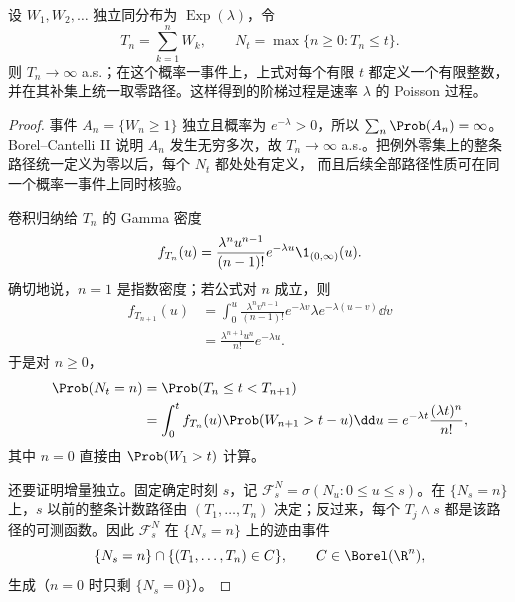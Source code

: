 \begin{theorem}\label{theorem:6-3-3-2}
设 $W_1,W_2,\ldots$ 独立同分布为 $\operatorname{Exp}(\lambda)$，令
\[
 T_n=\sum_{k=1}^nW_k,\qquad
 N_t=\max\{n\geq0:T_n\leq t\}.
\]
则 $T_n\to\infty$ a.s.；在这个概率一事件上，上式对每个有限 $t$ 都定义一个有限整数，
并在其补集上统一取零路径。这样得到的阶梯过程是速率
$\lambda$ 的 Poisson 过程。
\end{theorem}

\begin{proof}
事件 $A_n=\{W_n\geq1\}$ 独立且概率为 $e^{-\lambda}>0$，所以
$\sum_n\Prob(A_n)=\infty$。Borel--Cantelli II 说明 $A_n$ 发生无穷多次，故
$T_n\to\infty$ a.s.。把例外零集上的整条路径统一定义为零以后，每个 $N_t$ 都处处有定义，
而且后续全部路径性质可在同一个概率一事件上同时核验。

卷积归纳给 $T_n$ 的 Gamma 密度
\begin{equation}\label{eq:6-3-3-gamma-density}
 f_{T_n}(u)=\frac{\lambda^n u^{n-1}}{(n-1)!}e^{-\lambda u}\1_{(0,\infty)}(u).
\end{equation}
确切地说，$n=1$ 是指数密度；若公式对 $n$ 成立，则
\begin{align*}
 f_{T_{n+1}}(u)
 &=\int_0^u\frac{\lambda^nv^{n-1}}{(n-1)!}e^{-\lambda v}
     \lambda e^{-\lambda(u-v)}\dd v\\
 &=\frac{\lambda^{n+1}u^n}{n!}e^{-\lambda u}.
\end{align*}
于是对 $n\geq0$，
\begin{align*}
 \Prob(N_t=n)
 &=\Prob(T_n\leq t<T_{n+1})\\
 &=\int_0^tf_{T_n}(u)\Prob(W_{n+1}>t-u)\dd u
 =e^{-\lambda t}\frac{(\lambda t)^n}{n!},
\end{align*}
其中 $n=0$ 直接由 $\Prob(W_1>t)$ 计算。

还要证明增量独立。固定确定时刻 $s$，记
$\mathcal F_s^N=\sigma(N_u:0\le u\le s)$。在 $\{N_s=n\}$ 上，$s$ 以前的整条计数路径由
$(T_1,\ldots,T_n)$ 决定；反过来，每个 $T_j\wedge s$ 都是该路径的可测函数。因此
$\mathcal F_s^N$ 在 $\{N_s=n\}$ 上的迹由事件
\[
 \{N_s=n\}\cap\{(T_1,\ldots,T_n)\in C\},
 \qquad C\in\Borel(\R^n),
\]
生成（$n=0$ 时只剩 $\{N_s=0\}$）。


\end{proof}
